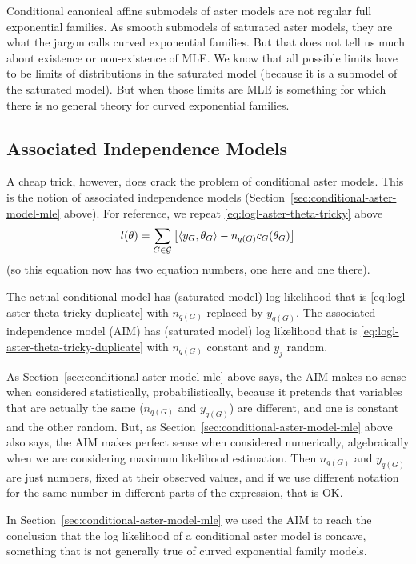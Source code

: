 Conditional canonical affine submodels of aster models are not
regular full exponential families.
As smooth submodels of saturated aster models, they are what the
jargon calls curved exponential families.
But that does not tell us much about existence or non-existence of MLE.
We know that all possible limits have to be limits of distributions
in the saturated model (because it is a submodel of the saturated model).
But when those limits are MLE is something for which there is no general
theory for curved exponential families.

\subsection{Associated Independence Models}

A cheap trick, however, does crack the problem of conditional aster models.
This is the notion of associated independence models
(Section~\ref{sec:conditional-aster-model-mle} above).
For reference, we repeat \eqref{eq:logl-aster-theta-tricky} above
\begin{equation} \label{eq:logl-aster-theta-tricky-duplicate}
   l(\theta)
   =
   \sum_{G \in \mathcal{G}}
   \left[ \langle y_G, \theta_G \rangle - n_{q(G)} c_G(\theta_G) \right]
\end{equation}
(so this equation now has two equation numbers, one here and one there).

The actual conditional model has (saturated model) log likelihood
that is \eqref{eq:logl-aster-theta-tricky-duplicate}
with $n_{q(G)}$ replaced by $y_{q(G)}$.
The associated independence model (AIM) has (saturated model) log likelihood
that is \eqref{eq:logl-aster-theta-tricky-duplicate}
with $n_{q(G)}$ constant and $y_j$ random.

As Section~\ref{sec:conditional-aster-model-mle} above says,
the AIM makes no sense when considered statistically, probabilistically,
because it pretends that variables that are actually the same
($n_{q(G)}$ and $y_{q(G)}$) are different, and one is constant
and the other random.  But,
as Section~\ref{sec:conditional-aster-model-mle} above also says,
the AIM makes perfect sense when considered numerically, algebraically
when we are considering maximum likelihood estimation.
Then $n_{q(G)}$ and $y_{q(G)}$ are just numbers, fixed at their observed
values, and if we use different notation for the same number in different
parts of the expression, that is OK.

In Section~\ref{sec:conditional-aster-model-mle}
we used the AIM to reach the conclusion that the log likelihood of
a conditional aster model is concave, something that is not generally
true of curved exponential family models.

